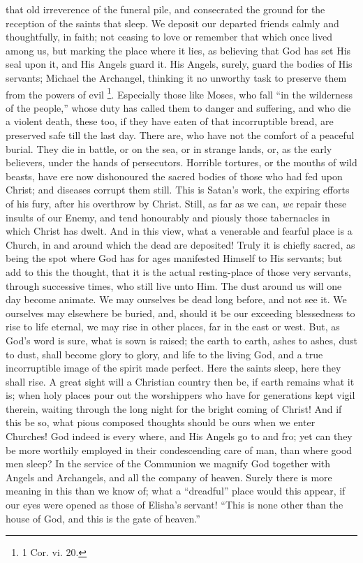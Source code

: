 that old irreverence of the funeral pile, and consecrated
the ground for the reception of the saints that sleep. We
deposit our departed friends calmly and thoughtfully, in
faith; not ceasing to love or remember that which once
lived among us, but marking the place where it lies, as
believing that God has set His seal upon it, and His
Angels guard it. His Angels, surely, guard the bodies of
His servants; Michael the Archangel, thinking it no
unworthy task to preserve them from the powers of evil \footnote{1 Cor. vi. 20.}. Especially those like Moses, who fall ``in
the wilderness of the people,'' whose duty has called
them to danger and suffering, and who die a violent
death, these too, if they have eaten of that
incorruptible bread, are preserved safe till the last
day. There are, who have not the comfort of a peaceful
burial. They die in battle, or on the sea, or in strange
lands, or, as the early believers, under the hands of
persecutors. Horrible tortures, or the mouths of wild
beasts, have ere now dishonoured the sacred bodies of
those who had fed upon Christ; and diseases corrupt them
still. This is Satan's work, the expiring efforts of his
fury, after his overthrow by Christ. Still, as far as we
can, \emph{we} repair these insults of our Enemy, and
tend honourably and piously those tabernacles in which
Christ has dwelt. And in this view, what a venerable and
fearful place is a Church, in and around which the dead
are deposited! Truly it is chiefly sacred, as being the
spot where God has for ages manifested Himself to His
servants; but add to this the thought, that it is the
actual resting-place of those very servants, through
successive times, who still live unto Him. The dust
around us will one day become animate. We may ourselves
be dead long before, and not see it. We ourselves may
elsewhere be buried, and, should it be our exceeding
blessedness to rise to life eternal, we may rise in other
places, far in the east or west. But, as God's word is
sure, what is sown is raised; the earth to earth, ashes
to ashes, dust to dust, shall become glory to glory, and
life to the living God, and a true incorruptible image of
the spirit made perfect. Here the saints sleep, here they
shall rise. A great sight will a Christian country then
be, if earth remains what it is; when holy places pour
out the worshippers who have for generations kept vigil
therein, waiting through the long night for the bright
coming of Christ! And if this be so, what pious composed
thoughts should be ours when we enter Churches! God
indeed is every where, and His Angels go to and fro; yet
can they be more worthily employed in their condescending
care of man, than where good men sleep? In the service of
the Communion we magnify God together with Angels and
Archangels, and all the company of heaven. Surely there
is more meaning in this than we know of; what a
``dreadful'' place would this appear, if our eyes
were opened as those of Elisha's servant! ``This is
none other than the house of God, and this is the gate of
heaven.''

